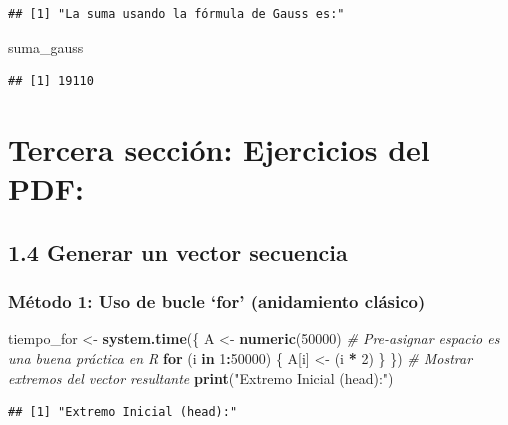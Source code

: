 \documentclass[]{llncs}
\newenvironment{Shaded}{\begin{snugshade}}{\end{snugshade}}
\newcommand{\CommentTok}[1]{\textcolor[rgb]{0.56,0.35,0.01}{\textit{#1}}}
\newcommand{\ControlFlowTok}[1]{\textcolor[rgb]{0.13,0.29,0.53}{\textbf{#1}}}
\newcommand{\DecValTok}[1]{\textcolor[rgb]{0.00,0.00,0.81}{#1}}
\newcommand{\FunctionTok}[1]{\textcolor[rgb]{0.13,0.29,0.53}{\textbf{#1}}}
\newcommand{\NormalTok}[1]{#1}
\newcommand{\OtherTok}[1]{\textcolor[rgb]{0.56,0.35,0.01}{#1}}
\newcommand{\SpecialCharTok}[1]{\textcolor[rgb]{0.81,0.36,0.00}{\textbf{#1}}}
\newcommand{\StringTok}[1]{\textcolor[rgb]{0.31,0.60,0.02}{#1}}
\begin{document}
\begin{verbatim}
## [1] "La suma usando la fórmula de Gauss es:"
\end{verbatim}

\begin{Shaded}
\begin{Highlighting}[]
\NormalTok{suma\_gauss}
\end{Highlighting}
\end{Shaded}

\begin{verbatim}
## [1] 19110
\end{verbatim}

\section{Tercera sección: Ejercicios del
PDF:}\label{tercera-secciuxf3n-ejercicios-del-pdf}

\subsection{1.4 Generar un vector
secuencia}\label{generar-un-vector-secuencia}

\subsubsection{Método 1: Uso de bucle `for' (anidamiento
clásico)}\label{muxe9todo-1-uso-de-bucle-for-anidamiento-cluxe1sico}

\begin{Shaded}
\begin{Highlighting}[]
\NormalTok{tiempo\_for }\OtherTok{\textless{}{-}} \FunctionTok{system.time}\NormalTok{(\{}
\NormalTok{  A }\OtherTok{\textless{}{-}} \FunctionTok{numeric}\NormalTok{(}\DecValTok{50000}\NormalTok{) }\CommentTok{\# Pre{-}asignar espacio es una buena práctica en R}
  \ControlFlowTok{for}\NormalTok{ (i }\ControlFlowTok{in} \DecValTok{1}\SpecialCharTok{:}\DecValTok{50000}\NormalTok{) \{ }
\NormalTok{    A[i] }\OtherTok{\textless{}{-}}\NormalTok{ (i }\SpecialCharTok{*} \DecValTok{2}\NormalTok{) }
\NormalTok{  \}}
\NormalTok{\})}
\CommentTok{\# Mostrar extremos del vector resultante}
\FunctionTok{print}\NormalTok{(}\StringTok{"Extremo Inicial (head):"}\NormalTok{)}
\end{Highlighting}
\end{Shaded}

\begin{verbatim}
## [1] "Extremo Inicial (head):"
\end{verbatim}
\end{document}
